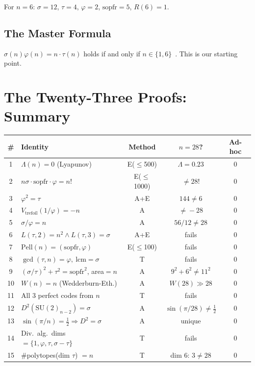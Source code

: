 \documentclass[11pt,a4paper]{article}
\begin{document}
For $n=6$: $\sigma=12$, $\tau=4$, $\varphi=2$, $\mathrm{sopfr}=5$, $R(6)=1$.

\subsection{The Master Formula}

$\sigma(n)\varphi(n) = n\cdot\tau(n)$ holds if and only if $n \in \{1, 6\}$~\cite{park2026}. This is our starting point.

\section{The Twenty-Three Proofs: Summary}

\begin{table}[h!]
\centering
\small
\begin{tabular}{@{}clccc@{}}
\toprule
\# & Identity & Method & $n\!=\!28$? & Ad-hoc \\
\midrule
1 & $\Lambda(n) = 0$ (Lyapunov) & E($\le$500) & $\Lambda\!=\!0.23$ & 0 \\
2 & $n\sigma\cdot\mathrm{sopfr}\cdot\varphi = n!$ & E($\le$1000) & $\neq 28!$ & 0 \\
3 & $\varphi^2 = \tau$ & A+E & $144\neq 6$ & 0 \\
4 & $V_{\text{trefoil}}(1/\varphi) = -n$ & A & $\neq\!-28$ & 0 \\
5 & $\sigma/\varphi = n$ & A & $56/12\neq 28$ & 0 \\
6 & $L(\tau,2)\!=\!n^2 \wedge L(\tau,3)\!=\!\sigma$ & A+E & fails & 0 \\
7 & $\mathrm{Pell}(n) = (\mathrm{sopfr},\varphi)$ & E($\le$100) & fails & 0 \\
8 & $\gcd(\tau,n)\!=\!\varphi,\ \mathrm{lcm}\!=\!\sigma$ & T & fails & 0 \\
9 & $(\sigma/\tau)^2+\tau^2 = \mathrm{sopfr}^2$, area$=n$ & A & $9^2\!+\!6^2\!\neq\!11^2$ & 0 \\
10 & $W(n) = n$ (Wedderburn-Eth.) & A & $W(28)\gg 28$ & 0 \\
11 & All 3 perfect codes from $n$ & T & fails & 0 \\
12 & $D^2(\mathrm{SU}(2)_{n-2}) = \sigma$ & A & $\sin(\pi/28)\neq\tfrac{1}{2}$ & 0 \\
13 & $\sin(\pi/n) = \tfrac{1}{2} \Rightarrow D^2=\sigma$ & A & unique & 0 \\
14 & Div.\ alg.\ dims $=\{1,\varphi,\tau,\sigma\!-\!\tau\}$ & T & fails & 0 \\
15 & $\#$polytopes(dim $\tau$) $= n$ & T & dim $6$: $3\neq 28$ & 0 \\

\end{tabular}
\end{table}
\end{document}
